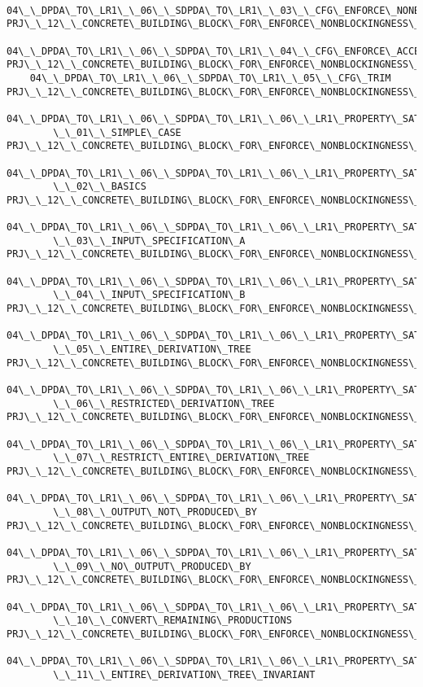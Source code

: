 \begin{verbatim}
    04\_\_DPDA\_TO\_LR1\_\_06\_\_SDPDA\_TO\_LR1\_\_03\_\_CFG\_ENFORCE\_NONBLOCKINGNESS
PRJ\_\_12\_\_CONCRETE\_BUILDING\_BLOCK\_FOR\_ENFORCE\_NONBLOCKINGNESS\_\_
    04\_\_DPDA\_TO\_LR1\_\_06\_\_SDPDA\_TO\_LR1\_\_04\_\_CFG\_ENFORCE\_ACCESSIBLE
PRJ\_\_12\_\_CONCRETE\_BUILDING\_BLOCK\_FOR\_ENFORCE\_NONBLOCKINGNESS\_\_
    04\_\_DPDA\_TO\_LR1\_\_06\_\_SDPDA\_TO\_LR1\_\_05\_\_CFG\_TRIM
PRJ\_\_12\_\_CONCRETE\_BUILDING\_BLOCK\_FOR\_ENFORCE\_NONBLOCKINGNESS\_\_
    04\_\_DPDA\_TO\_LR1\_\_06\_\_SDPDA\_TO\_LR1\_\_06\_\_LR1\_PROPERTY\_SATSIFACTION
        \_\_01\_\_SIMPLE\_CASE
PRJ\_\_12\_\_CONCRETE\_BUILDING\_BLOCK\_FOR\_ENFORCE\_NONBLOCKINGNESS\_\_
    04\_\_DPDA\_TO\_LR1\_\_06\_\_SDPDA\_TO\_LR1\_\_06\_\_LR1\_PROPERTY\_SATSIFACTION
        \_\_02\_\_BASICS
PRJ\_\_12\_\_CONCRETE\_BUILDING\_BLOCK\_FOR\_ENFORCE\_NONBLOCKINGNESS\_\_
    04\_\_DPDA\_TO\_LR1\_\_06\_\_SDPDA\_TO\_LR1\_\_06\_\_LR1\_PROPERTY\_SATSIFACTION
        \_\_03\_\_INPUT\_SPECIFICATION\_A
PRJ\_\_12\_\_CONCRETE\_BUILDING\_BLOCK\_FOR\_ENFORCE\_NONBLOCKINGNESS\_\_
    04\_\_DPDA\_TO\_LR1\_\_06\_\_SDPDA\_TO\_LR1\_\_06\_\_LR1\_PROPERTY\_SATSIFACTION
        \_\_04\_\_INPUT\_SPECIFICATION\_B
PRJ\_\_12\_\_CONCRETE\_BUILDING\_BLOCK\_FOR\_ENFORCE\_NONBLOCKINGNESS\_\_
    04\_\_DPDA\_TO\_LR1\_\_06\_\_SDPDA\_TO\_LR1\_\_06\_\_LR1\_PROPERTY\_SATSIFACTION
        \_\_05\_\_ENTIRE\_DERIVATION\_TREE
PRJ\_\_12\_\_CONCRETE\_BUILDING\_BLOCK\_FOR\_ENFORCE\_NONBLOCKINGNESS\_\_
    04\_\_DPDA\_TO\_LR1\_\_06\_\_SDPDA\_TO\_LR1\_\_06\_\_LR1\_PROPERTY\_SATSIFACTION
        \_\_06\_\_RESTRICTED\_DERIVATION\_TREE
PRJ\_\_12\_\_CONCRETE\_BUILDING\_BLOCK\_FOR\_ENFORCE\_NONBLOCKINGNESS\_\_
    04\_\_DPDA\_TO\_LR1\_\_06\_\_SDPDA\_TO\_LR1\_\_06\_\_LR1\_PROPERTY\_SATSIFACTION
        \_\_07\_\_RESTRICT\_ENTIRE\_DERIVATION\_TREE
PRJ\_\_12\_\_CONCRETE\_BUILDING\_BLOCK\_FOR\_ENFORCE\_NONBLOCKINGNESS\_\_
    04\_\_DPDA\_TO\_LR1\_\_06\_\_SDPDA\_TO\_LR1\_\_06\_\_LR1\_PROPERTY\_SATSIFACTION
        \_\_08\_\_OUTPUT\_NOT\_PRODUCED\_BY
PRJ\_\_12\_\_CONCRETE\_BUILDING\_BLOCK\_FOR\_ENFORCE\_NONBLOCKINGNESS\_\_
    04\_\_DPDA\_TO\_LR1\_\_06\_\_SDPDA\_TO\_LR1\_\_06\_\_LR1\_PROPERTY\_SATSIFACTION
        \_\_09\_\_NO\_OUTPUT\_PRODUCED\_BY
PRJ\_\_12\_\_CONCRETE\_BUILDING\_BLOCK\_FOR\_ENFORCE\_NONBLOCKINGNESS\_\_
    04\_\_DPDA\_TO\_LR1\_\_06\_\_SDPDA\_TO\_LR1\_\_06\_\_LR1\_PROPERTY\_SATSIFACTION
        \_\_10\_\_CONVERT\_REMAINING\_PRODUCTIONS
PRJ\_\_12\_\_CONCRETE\_BUILDING\_BLOCK\_FOR\_ENFORCE\_NONBLOCKINGNESS\_\_
    04\_\_DPDA\_TO\_LR1\_\_06\_\_SDPDA\_TO\_LR1\_\_06\_\_LR1\_PROPERTY\_SATSIFACTION
        \_\_11\_\_ENTIRE\_DERIVATION\_TREE\_INVARIANT

\end{verbatim}
